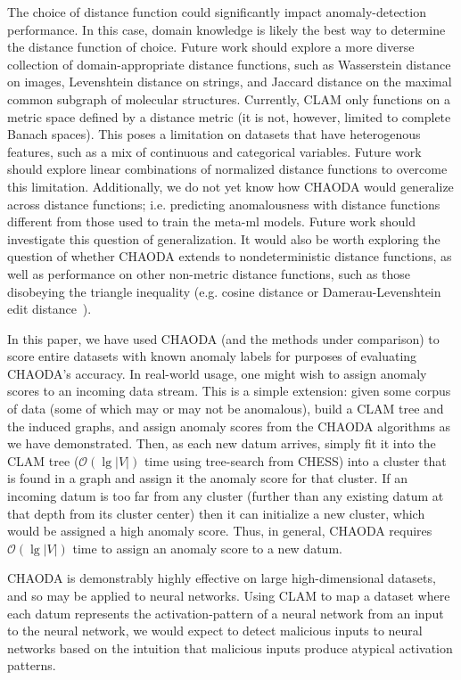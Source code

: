 The choice of distance function could significantly impact anomaly-detection performance.
In this case, domain knowledge is likely the best way to determine the distance function of choice.
Future work should explore a more diverse collection of domain-appropriate distance functions, such as Wasserstein distance on images, Levenshtein distance on strings, and Jaccard distance on the maximal common subgraph of molecular structures.
Currently, CLAM only functions on a metric space defined by a distance metric (it is not, however, limited to complete Banach spaces).
This poses a limitation on datasets that have heterogenous features, such as a mix of continuous and categorical variables.
Future work should explore linear combinations of normalized distance functions to overcome this limitation.
Additionally, we do not yet know how CHAODA would generalize across distance functions; i.e. predicting anomalousness with distance functions different from those used to train the meta-ml models.
Future work should investigate this question of generalization.
It would also be worth exploring the question of whether CHAODA extends to nondeterministic distance functions, as well as performance on other non-metric distance functions, such as those disobeying the triangle inequality (e.g. cosine distance or Damerau-Levenshtein edit distance~\cite{damerau1964technique}).

In this paper, we have used CHAODA (and the methods under comparison) to score entire datasets with known anomaly labels for purposes of evaluating CHAODA's accuracy.
In real-world usage, one might wish to assign anomaly scores to an incoming data stream.
This is a simple extension: given some corpus of data (some of which may or may not be anomalous), build a CLAM tree and the induced graphs, and assign anomaly scores from the CHAODA algorithms as we have demonstrated.
Then, as each new datum arrives, simply fit it into the CLAM tree ($\mathcal{O}(\lg |V|)$ time using tree-search from CHESS) into a cluster that is found in a graph and assign it the anomaly score for that cluster.
If an incoming datum is too far from any cluster (further than any existing datum at that depth from its cluster center) then it can initialize a new cluster, which would be assigned a high anomaly score.
Thus, in general, CHAODA requires $\mathcal{O}(\lg |V|)$ time to assign an anomaly score to a new datum.


CHAODA is demonstrably highly effective on large high-dimensional datasets, and so may be applied to neural networks.
Using CLAM to map a dataset where each datum represents the activation-pattern of a neural network from an input to the neural network, we would expect to detect malicious inputs to neural networks based on the intuition that malicious inputs produce atypical activation patterns.

